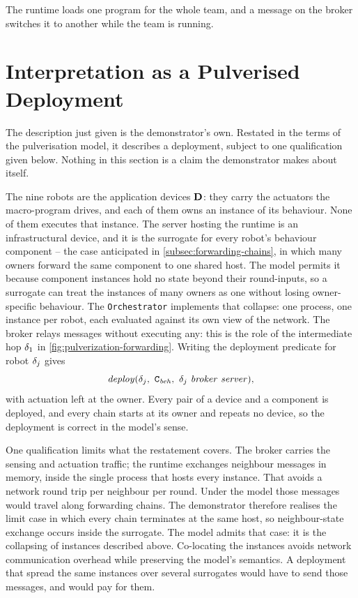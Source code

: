 The runtime loads one program for the whole team, and a message on the broker switches it to another while the team is running.

\section{Interpretation as a Pulverised Deployment}
\label{sec:emerge-as-pulverisation}

The description just given is the demonstrator's own.
%
Restated in the terms of the pulverisation model, it describes a deployment, subject to one qualification given below.
%
Nothing in this section is a claim the demonstrator makes about itself.

The nine robots are the application devices $\mathbf{D}$:
they carry the actuators the macro-program drives, and each of them owns an instance of its behaviour.
%
None of them executes that instance.
%
The server hosting the runtime is an infrastructural device, and it is the surrogate for every robot's behaviour component --
the case anticipated in \cref{subsec:forwarding-chains}, in which many owners forward the same component to one shared host.
%
The model permits it because component instances hold no state beyond their round-inputs,
so a surrogate can treat the instances of many owners as one without losing owner-specific behaviour.
%
The \texttt{Orchestrator} implements that collapse:
one process, one instance per robot, each evaluated against its own view of the network.
%
The broker relays messages without executing any: this is the role of the intermediate hop $\delta_1$ in \cref{fig:pulverization-forwarding}.
%
Writing the deployment predicate for robot $\delta_j$ gives
%
\[
    \deploy(\deviceId_j,\ \component_{\mathit{beh}},\ \deviceId_j\ \mathit{broker}\ \mathit{server}),
\]
%
with actuation left at the owner.
%
Every pair of a device and a component is deployed, and every chain starts at its owner and repeats no device, so the deployment is correct in the model's sense.

One qualification limits what the restatement covers.
%
The broker carries the sensing and actuation traffic;
the runtime exchanges neighbour messages in memory, inside the single process that hosts every instance.
That avoids a network round trip per neighbour per round.
%
Under the model those messages would travel along forwarding chains.
%
The demonstrator therefore realises the limit case in which every chain terminates at the same host,
so neighbour-state exchange occurs inside the surrogate.
%
The model admits that case: it is the collapsing of instances described above.
Co-locating the instances avoids network communication overhead while preserving the model's semantics.
%
A deployment that spread the same instances over several surrogates would have to send those messages, and would pay for them.

